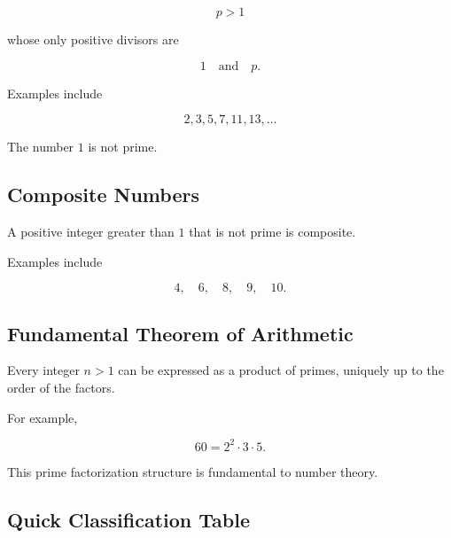 \[
p>1
\]

whose only positive divisors are

\[
\boxed{
1
\quad\text{and}\quad
p.
}
\]

Examples include

\[
\boxed{
2,3,5,7,11,13,\ldots
}
\]

The number \(1\) is not prime.

\subsection{Composite Numbers}
\label{subsec:composite-numbers-reference}

A positive integer greater than \(1\) that is not prime is composite.

Examples include

\[
\boxed{
4,
\quad
6,
\quad
8,
\quad
9,
\quad
10.
}
\]

\subsection{Fundamental Theorem of Arithmetic}
\label{subsec:fundamental-theorem-arithmetic-reference}

Every integer \(n>1\) can be expressed as a product of primes, uniquely up to
the order of the factors.

For example,

\[
\boxed{
60
=
2^2\cdot3\cdot5.
}
\]

This prime factorization structure is fundamental to number theory.

\subsection{Quick Classification Table}
\label{subsec:number-systems-classification-table}

